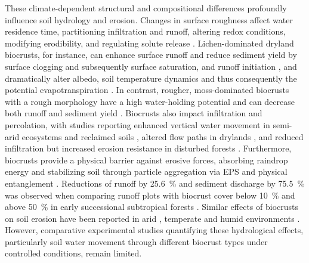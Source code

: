 These climate-dependent structural and compositional differences profoundly influence soil hydrology and erosion. Changes in surface roughness affect water residence time, partitioning infiltration and runoff, altering redox conditions, modifying erodibility, and regulating solute release \citep{Kalnejais2010,Kidron2022}. Lichen-dominated dryland biocrusts, for instance, can enhance surface runoff and reduce sediment yield by surface clogging and subsequently surface saturation, and runoff initiation \citep{Kidron2021}, and dramatically alter albedo, soil temperature dynamics and thus consequently the potential evapotranspiration \citep{Liu2020,Rutherford2017,Whitney2017,Xiao2019}. In contrast, rougher, moss-dominated biocrusts with a rough morphology have a high water-holding potential and can decrease both runoff and sediment yield \citep{Juan2023,Seitz2017,Silva2019,Zeng2025}. Biocrusts also impact infiltration and percolation, with studies reporting enhanced vertical water movement in semi-arid ecosystems \citep{Chamizo2016} and reclaimed soils \citep{Gypser2016}, altered flow paths in drylands \citep{Li2022}, and reduced infiltration but increased erosion resistance in disturbed forests \citep{Szyja2023}. Furthermore, biocrusts provide a physical barrier against erosive forces, absorbing raindrop energy and stabilizing soil through particle aggregation via EPS and physical entanglement \citep{Costa2018,Riveras-Munoz2022,Rodriguez2024,Tourney2014,Xiao2022}. Reductions of runoff by \SI{25.6}{\percent} and sediment discharge by \SI{75.5}{\percent} was observed when comparing runoff plots with biocrust cover below \SI{10}{\percent} and above \SI{50}{\percent} in early successional subtropical forests \citep{Seitz2017}. Similar effects of biocrusts on soil erosion have been reported in arid \citep{Bowker2018,Eldridge2021}, temperate \citep{Gall2022b} and humid environments \citep{Guo2022,Zhao2014}. However, comparative experimental studies quantifying these hydrological effects, particularly soil water movement through different biocrust types under controlled conditions, remain limited.


